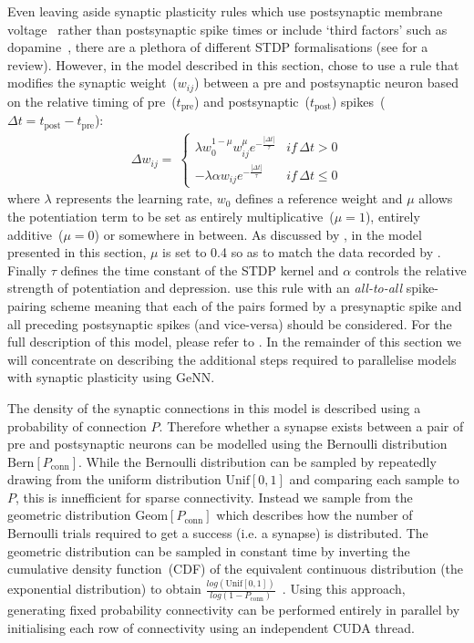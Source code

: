 \documentclass[utf8]{frontiersSCNS} %
\begin{document}
Even leaving aside synaptic plasticity rules which use postsynaptic membrane voltage~\citep{Brader2007,Clopath2010c} rather than postsynaptic spike times or include `third factors' such as dopamine~\citep{Izhikevich2007}, there are a plethora of different STDP formalisations (see \citet{Morrison2008} for a review).
However, in the model described in this section, \citet{Morrison2007} chose to use a rule that modifies the synaptic weight~($w_{ij}$) between a pre and postsynaptic neuron based on the relative timing of pre~($t_{\text{pre}}$) and postsynaptic~($t_{\text{post}}$) spikes~($\Delta t = t_{\text{post}} - t_{\text{pre}}$):
%
\begin{align}
    \Delta w_{ij} = \
        \begin{cases}
            \lambda w_{0}^{1-\mu} w_{ij}^{\mu} e^{-\frac{|\Delta t|}{\tau}} & if\, \Delta t>0\\
            -\lambda \alpha w_{ij} e^{-\frac{|\Delta t|}{\tau}}             & if\, \Delta t\leq0
        \end{cases}\label{eq:mad_stdp}
\end{align}
%
where $\lambda$ represents the learning rate, $w_{0}$ defines a reference weight and $\mu$ allows the potentiation term to be set as entirely multiplicative~($\mu=1$), entirely additive~($\mu=0$) or somewhere in between.
As discussed by \citet{Morrison2007}, in the model presented in this section, $\mu$ is set to \num{0.4} so as to match the data recorded by \citet{Bi1998}.
Finally $\tau$ defines the time constant of the STDP kernel and $\alpha$ controls the relative strength of potentiation and depression.
\citeauthor{Morrison2007} use this rule with an \textit{all-to-all} spike-pairing scheme meaning that each of the pairs formed by a presynaptic spike and all preceding postsynaptic spikes (and vice-versa) should be considered.
For the full description of this model, please refer to \citeauthor{Morrison2007}.
In the remainder of this section we will concentrate on describing the additional steps required to parallelise models with synaptic plasticity using GeNN.

The density of the synaptic connections in this model is described using a probability of connection $P$.
Therefore whether a synapse exists between a pair of pre and postsynaptic neurons can be modelled using the Bernoulli distribution $\text{Bern}[P_{\text{conn}}]$.
While the Bernoulli distribution can be sampled by repeatedly drawing from the uniform distribution $\text{Unif}[0, 1]$ and comparing each sample to $P$, this is innefficient for sparse connectivity.
Instead we sample from the geometric distribution $\text{Geom}[P_{\text{conn}}]$ which describes how the number of Bernoulli trials required to get a success (i.e. a synapse) is distributed.
The geometric distribution can be sampled in constant time by inverting the cumulative density function~(CDF) of the equivalent continuous distribution (the exponential distribution) to obtain $\frac{log(\text{Unif}[0, 1])}{log(1 - P_{\text{conn}})}$~\citep[p499]{DevroyeLuc2013}.
Using this approach, generating fixed probability connectivity can be performed entirely in parallel by initialising each row of connectivity using an independent CUDA thread.
\end{document}
